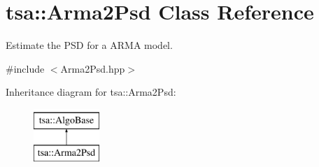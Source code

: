 \hypertarget{classtsa_1_1_arma2_psd}{}\section{tsa\+:\+:Arma2\+Psd Class Reference}
\label{classtsa_1_1_arma2_psd}


Estimate the P\+SD for a A\+R\+MA model.  




{\ttfamily \#include $<$Arma2\+Psd.\+hpp$>$}

Inheritance diagram for tsa\+:\+:Arma2\+Psd\+:\begin{figure}[H]
\begin{center}
\leavevmode
\includegraphics[height=2.000000cm]{classtsa_1_1_arma2_psd}
\end{center}
\end{figure}
